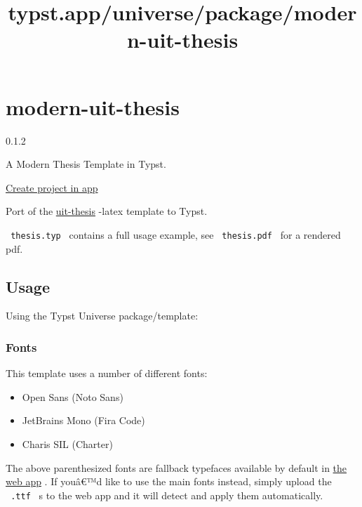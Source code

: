 \title{typst.app/universe/package/modern-uit-thesis}

\label{banner}
\label{template-thumbnail}

\section{modern-uit-thesis}\label{modern-uit-thesis}

{ 0.1.2 }

A Modern Thesis Template in Typst.

\href{/app?template=modern-uit-thesis&version=0.1.2}{Create project in
app}

\label{readme}
Port of the \href{https://github.com/egraff/uit-thesis}{uit-thesis}
-latex template to Typst.

\texttt{\ thesis.typ\ } contains a full usage example, see
\texttt{\ thesis.pdf\ } for a rendered pdf.

\subsection{Usage}\label{usage}

Using the Typst Universe package/template:

\begin{Shaded}
\begin{Highlighting}[]
\end{Highlighting}
\end{Shaded}

\subsubsection{Fonts}\label{fonts}

This template uses a number of different fonts:

\begin{itemize}
\tightlist
\item
  Open Sans (Noto Sans)
\item
  JetBrains Mono (Fira Code)
\item
  Charis SIL (Charter)
\end{itemize}

The above parenthesized fonts are fallback typefaces available by
default in \href{https://typst.app/}{the web app} . If youâ€™d like to
use the main fonts instead, simply upload the \texttt{\ .ttf\ } s to the
web app and it will detect and apply them automatically.

